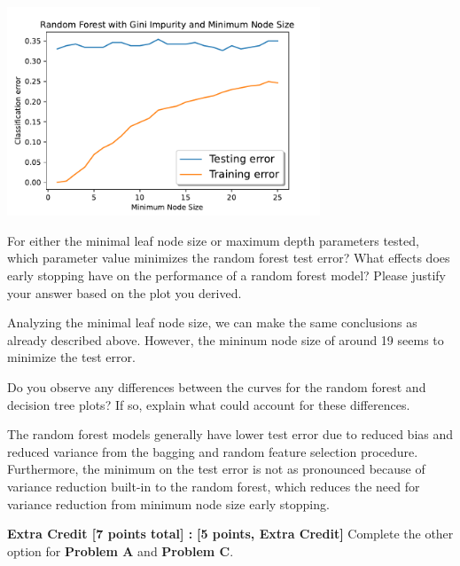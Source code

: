 \begin{solution}
    \begin{center}
        \includegraphics[width=0.7\textwidth]{fig3.pdf}
    \end{center}
\end{solution}

\problem[6]
For either the minimal leaf node size or maximum depth parameters tested, which parameter value minimizes the random forest test error? What effects does early stopping have on the performance of a random forest model?
Please justify your answer based on the plot you derived.

\begin{solution}
    Analyzing the minimal leaf node size, we can make the same conclusions as already described above. However, the mininum node size of around 19 seems to minimize the test error.
\end{solution}

\problem[4]
Do you observe any differences between the curves for the random forest and decision tree plots? If so, explain what could account for these differences.

\begin{solution}
    The random forest models generally have lower test error due to reduced bias and reduced variance from the bagging and random feature selection procedure. Furthermore, the minimum on the test error is not as pronounced because of variance reduction built-in to the random forest, which reduces the need for variance reduction from minimum node size early stopping.
\end{solution}

\textbf{Extra Credit [7 points total] :} \problem\textbf{[5 points, Extra Credit]} Complete the other option for \textbf{Problem A }and \textbf{Problem C}.

